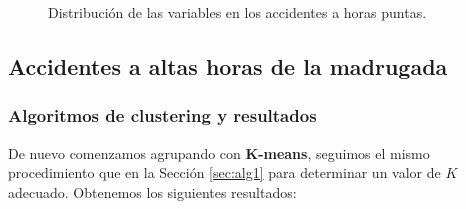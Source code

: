\documentclass[oneside]{book}
\begin{document}
\begin{figure}[H]
  \centering
  \caption{Distribución de las variables en los accidentes a horas
    puntas.}
  \label{fig:distrib-puntas}
\end{figure}

\subsection{Accidentes a altas horas de la madrugada}

\subsubsection{Algoritmos de clustering y resultados}

De nuevo comenzamos agrupando con \textbf{K-means}, seguimos el mismo
procedimiento que en la Sección \ref{sec:alg1} para determinar un
valor de $K$ adecuado. Obtenemos los siguientes resultados:
\end{document}
